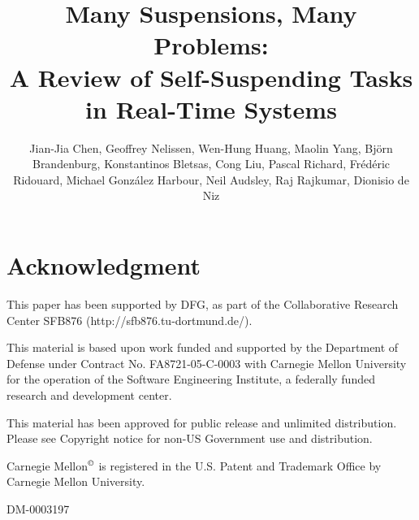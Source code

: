 



\papertrue 



\title{Many Suspensions, Many Problems:\\
A Review of Self-Suspending Tasks in Real-Time Systems}
\author{Jian-Jia Chen, Geoffrey Nelissen, Wen-Hung
  Huang, Maolin Yang, Bj\"orn Brandenburg,
  Konstantinos Bletsas, Cong Liu, Pascal
  Richard, Fr\'ed\'eric Ridouard, Michael Gonz\'alez
  Harbour, Neil Audsley,  Raj Rajkumar, Dionisio de Niz}

\maketitle  
 
 









\section*{Acknowledgment}

This paper has been supported by DFG, as part of the Collaborative
Research Center SFB876 (http://sfb876.tu-dortmund.de/).

This material is based upon work funded and supported by the Department of Defense under Contract No. FA8721-05-C-0003 with Carnegie Mellon University for the operation of the Software Engineering Institute, a federally funded research and development center.

 This material has been approved for public release and unlimited distribution. Please see Copyright notice for non-US Government use and distribution.

\noindent Carnegie Mellon$^\copyright$ is registered in the U.S. Patent and Trademark Office by Carnegie Mellon University.

\noindent DM-0003197

{}


